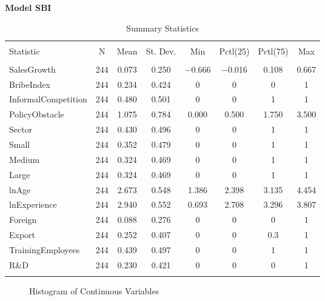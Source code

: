 \newpage

\textbf{\Large Model SBI}
\begin{table}[!htbp] \centering 
  \caption*{Summary Statistics} 
\begin{tabular}{@{\extracolsep{5pt}}lccccccc} 
\\[-1.8ex]\hline 
\hline \\[-1.8ex] 
Statistic & \multicolumn{1}{c}{N} & \multicolumn{1}{c}{Mean} & \multicolumn{1}{c}{St. Dev.} & \multicolumn{1}{c}{Min} & \multicolumn{1}{c}{Pctl(25)} & \multicolumn{1}{c}{Pctl(75)} & \multicolumn{1}{c}{Max} \\ 
\hline \\[-1.8ex] 
SalesGrowth & 244 & 0.073 & 0.250 & $-$0.666 & $-$0.016 & 0.108 & 0.667 \\ 
BribeIndex & 244 & 0.234 & 0.424 & 0 & 0 & 0 & 1 \\ 
InformalCompetition & 244 & 0.480 & 0.501 & 0 & 0 & 1 & 1 \\ 
PolicyObstacle & 244 & 1.075 & 0.784 & 0.000 & 0.500 & 1.750 & 3.500 \\ 
Sector & 244 & 0.430 & 0.496 & 0 & 0 & 1 & 1 \\ 
Small & 244 & 0.352 & 0.479 & 0 & 0 & 1 & 1 \\ 
Medium & 244 & 0.324 & 0.469 & 0 & 0 & 1 & 1 \\ 
Large & 244 & 0.324 & 0.469 & 0 & 0 & 1 & 1 \\ 
lnAge & 244 & 2.673 & 0.548 & 1.386 & 2.398 & 3.135 & 4.454 \\ 
lnExperience & 244 & 2.940 & 0.552 & 0.693 & 2.708 & 3.296 & 3.807 \\ 
Foreign & 244 & 0.088 & 0.276 & 0 & 0 & 0 & 1 \\ 
Export & 244 & 0.252 & 0.407 & 0 & 0 & 0.3 & 1 \\ 
TrainingEmployees & 244 & 0.439 & 0.497 & 0 & 0 & 1 & 1 \\ 
R\&D & 244 & 0.230 & 0.421 & 0 & 0 & 0 & 1 \\ 
\hline \\[-1.8ex] 
\end{tabular} 
\end{table} 

\begin{figure}[H]%
    \centering
    \begin{subfigure}
    \texttt{[image: chinchilab-template/Pictures/Model1.2\_hist\_a.png]}
    \end{subfigure}
    \begin{subfigure}
    \texttt{[image: chinchilab-template/Pictures/Model1.2\_hist\_b.png]}
    \end{subfigure}
    \begin{subfigure}
    \texttt{[image: chinchilab-template/Pictures/Model1.2\_hist\_c.png]}
    \end{subfigure}
    \begin{subfigure}
    \texttt{[image: chinchilab-template/Pictures/Model1.2\_hist\_d.png]}
    \end{subfigure}
    \caption*{Histogram of Continuous Variables}%
    \label{fig:example}%
\end{figure}

